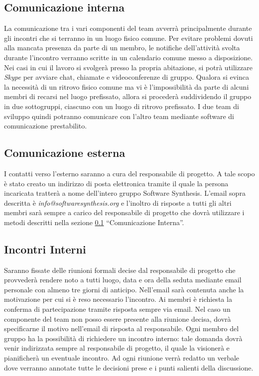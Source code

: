 \subsection{Comunicazione interna}
\label{sec:comunicazione_interna}
La comunicazione tra i vari componenti del team avverrà principalmente durante gli incontri che si terranno in un luogo fisico comune. Per evitare problemi dovuti alla mancata presenza da parte di un membro, le notifiche dell'attività svolta durante l'incontro verranno scritte in un calendario comune messo a disposizione.
Nei casi in cui il lavoro si svolgerà presso la propria abitazione, si potrà utilizzare \textit{Skype} per avviare chat, chiamate e videoconferenze di gruppo.
Qualora si evinca la necessità di un ritrovo fisico comune ma vi è l'impossibilità da parte di alcuni membri di recarsi nel luogo prefissato, allora si procederà suddividendo il gruppo in due sottogruppi, ciascuno con un luogo di ritrovo prefissato. I due team di sviluppo quindi potranno comunicare con l'altro team mediante software di comunicazione prestabilito.


\subsection{Comunicazione esterna}
I contatti verso l'esterno saranno a cura del responsabile di progetto. A tale scopo è stato creato un indirizzo di posta elettronica tramite il quale la persona incaricata tratterà a nome dell'intero gruppo Software Synthesis. L'email sopra descritta è \textit{info@softwaresynthesis.org} e l'inoltro di risposte a tutti gli altri membri sarà sempre a carico del responsabile di progetto che dovrà utilizzare i metodi descritti nella sezione \ref{sec:comunicazione_interna} ``Comunicazione Interna''.

\subsection{Incontri Interni}
Saranno fissate delle riunioni formali decise dal responsabile di progetto che provvederà rendere noto a tutti luogo, data e ora della seduta mediante email personale con almeno tre giorni di anticipo. Nell'email sarà contenuta anche la motivazione per cui si è reso necessario l'incontro. Ai membri è richiesta la conferma di partecipazione tramite risposta sempre via email. Nel caso un componente del team non posso essere presente alla riunione decisa, dovrà specificarne il motivo nell'email di risposta al responsabile.
Ogni membro del gruppo ha la possibilità di richiedere un incontro interno: tale domanda dovrà venir indirizzata sempre al responsabile di progetto, il quale la visionerà e pianificherà un eventuale incontro.
Ad ogni riunione verrà redatto un verbale dove verranno annotate tutte le decisioni prese e i punti salienti della discussione.

